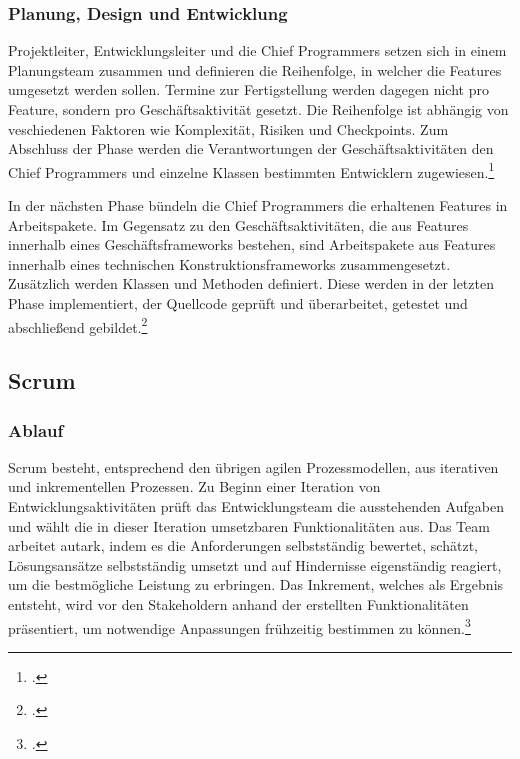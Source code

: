 \subsubsection{Planung, Design und Entwicklung}
Projektleiter, Entwicklungsleiter und die Chief Programmers setzen sich in einem Planungsteam zusammen und definieren die Reihenfolge, in welcher die Features umgesetzt werden sollen. Termine zur Fertigstellung werden dagegen nicht pro Feature, sondern pro Geschäftsaktivität gesetzt. Die Reihenfolge ist abhängig von veschiedenen Faktoren wie Komplexität, Risiken und Checkpoints. Zum Abschluss der Phase werden die Verantwortungen der Geschäftsaktivitäten den Chief Programmers und einzelne Klassen bestimmten Entwicklern zugewiesen.\footcite[Vgl.][Seite 276 f.]{highsmith}

In der nächsten Phase bündeln die Chief Programmers die erhaltenen Features in Arbeitspakete. Im Gegensatz zu den Geschäftsaktivitäten, die aus Features innerhalb eines Geschäftsframeworks bestehen, sind Arbeitspakete aus Features innerhalb eines technischen Konstruktionsframeworks zusammengesetzt. Zusätzlich werden Klassen und Methoden definiert. Diese werden in der letzten Phase implementiert, der Quellcode geprüft und überarbeitet, getestet und abschließend gebildet.\footcite[Vgl.][Seite 277 f.]{highsmith}

\subsection{Scrum}
\subsubsection{Ablauf}
Scrum besteht, entsprechend den übrigen agilen Prozessmodellen, aus iterativen und inkrementellen Prozessen. Zu Beginn einer Iteration von Entwicklungsaktivitäten prüft das Entwicklungsteam die ausstehenden Aufgaben und wählt die in dieser Iteration umsetzbaren Funktionalitäten aus. Das Team arbeitet autark, indem es die Anforderungen selbstständig bewertet, schätzt, Lösungsansätze selbstständig umsetzt und auf Hindernisse eigenständig reagiert, um die bestmögliche Leistung zu erbringen. Das Inkrement, welches als Ergebnis entsteht, wird vor den Stakeholdern anhand der erstellten Funktionalitäten präsentiert, um notwendige Anpassungen frühzeitig bestimmen zu können.\footcite[Vgl.][Seite 6]{schwabo}

